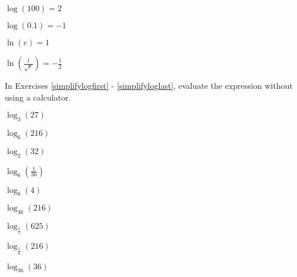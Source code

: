\documentclass{ximera}
\begin{document}
\begin{problem}
\begin{question}
$\log(100) = 2$ 
\end{question}

\begin{question}
$\log (0.1) = -1$
\end{question}

\begin{question}
$\ln(e) = 1$ 
\end{question}

\begin{question}\label{rewritelastex}
$\ln\left(\frac{1}{\sqrt{e}}\right) = -\frac{1}{2}$   
\end{question}

\end{problem}

\begin{problem}
In Exercises \ref{simplifylogfirst} - \ref{simplifyloglast}, evaluate the expression without using a calculator.

\begin{question}\label{simplifylogfirst}
$\log_{3} (27)$
\end{question}

\begin{question}
$\log_{6} (216)$
\end{question}

\begin{question}
$\log_{2} (32)$
\end{question}

\begin{question}
$\log_{6} \left( \frac{1}{36} \right)$
\end{question}

\begin{question}
$\log_{8} (4)$
\end{question}

\begin{question}
$\log_{36} (216)$
\end{question}

\begin{question}
$\log_{\frac{1}{5}} (625)$
\end{question}

\begin{question}
$\log_{\frac{1}{6}} (216)$
\end{question}

\begin{question}
$\log_{36} (36)$
\end{question}


\end{problem}
\end{document}
